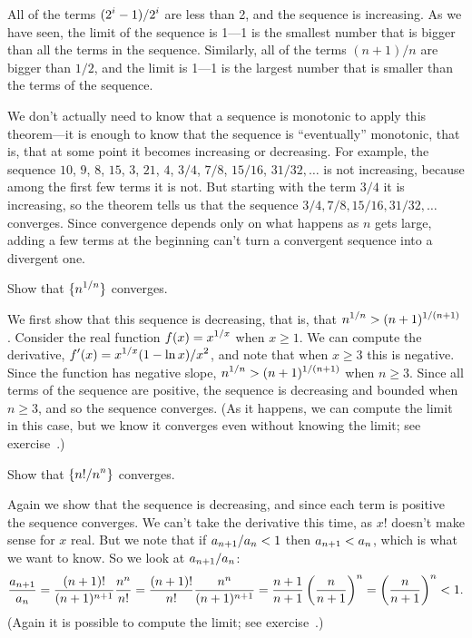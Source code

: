 \begin{example}
All of the terms $\displaystyle (2^i-1)/2^i$ are less than 2, and the sequence is
increasing. As we have seen, the limit of the sequence is 1---1 is the
smallest number that is bigger than all the terms in the sequence.
Similarly, all of the terms $(n+1)/n$ are bigger than $1/2$, and the
limit is 1---1 is the largest number that is smaller than the terms of
the sequence.
\end{example}

We don't actually need to know that a sequence is monotonic to apply
this theorem---it is enough to know that the sequence is
``eventually'' monotonic, that is, that at some point it becomes
increasing or decreasing. For example, the sequence $10$, $9$, $8$,
$15$, $3$, $21$, $4$, $3/4$, $7/8$, $15/16$, $31/32,\ldots$ is not
increasing, because among the first few terms it is not. But starting
with the term $3/4$ it is increasing, so the theorem tells us that the
sequence $3/4, 7/8, 15/16, 31/32,\ldots$ converges.  Since convergence
depends only on what happens as $n$ gets large, adding a few
terms at the beginning can't turn a convergent sequence into a
divergent one.

\begin{example}
Show that $\displaystyle\{n^{1/n}\}$ converges. 
\par\nobreak\ssk\noindent
We first show that 
this sequence is decreasing, that is, that $\displaystyle n^{1/n}>
(n+1)^{1/(n+1)}$. Consider the real function $\displaystyle f(x)=x^{1/x}$ when
$x\ge1$. We can compute the derivative, $\displaystyle f'(x)=x^{1/x}(1-\ln x)/x^2$,
and note that when $x\ge 3$ this is negative. Since the function has
negative slope, $\displaystyle n^{1/n}>
(n+1)^{1/(n+1)}$ when $n\ge 3$. Since all terms of the sequence are
positive, the sequence is decreasing and bounded when $n\ge3$, and so
the sequence converges. (As it happens, we can compute the limit in
this case, but we know it converges even without knowing the limit; see
exercise~.)
\end{example}

\begin{example}
Show that $\displaystyle\{n!/n^n\}$ converges.
\par\nobreak\ssk\noindent
Again we show that the sequence is decreasing, and since each term is
positive the sequence converges. We can't take the derivative this
time, as $x!$ doesn't make sense for $x$ real. But we note that if 
$\displaystyle a_{n+1}/a_n < 1$ then $\displaystyle a_{n+1}< a_n$, which is what we want to
know. So we look at $\displaystyle a_{n+1}/a_n$:
$$ 
  {a_{n+1}\over a_n} = {(n+1)!\over (n+1)^{n+1}}{n^n\over n!}=
  {(n+1)!\over n!}{n^n\over (n+1)^{n+1}}=
  {n+1\over n+1}\left({n\over n+1}\right)^n=
  \left({n\over n+1}\right)^n < 1.
$$
(Again it is possible to compute the limit; see
exercise~.)
\end{example}


